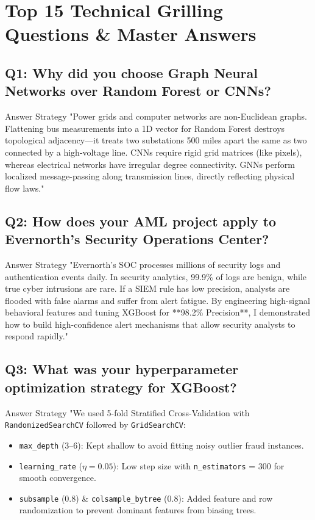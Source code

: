 \documentclass[11pt,a4paper]{article}
\begin{document}
\section{Top 15 Technical Grilling Questions \& Master Answers}

\subsection*{Q1: Why did you choose Graph Neural Networks over Random Forest or CNNs?}
\begin{ansbox}{Answer Strategy}
"Power grids and computer networks are non-Euclidean graphs. Flattening bus measurements into a 1D vector for Random Forest destroys topological adjacency—it treats two substations 500 miles apart the same as two connected by a high-voltage line. CNNs require rigid grid matrices (like pixels), whereas electrical networks have irregular degree connectivity. GNNs perform localized message-passing along transmission lines, directly reflecting physical flow laws."
\end{ansbox}

\subsection*{Q2: How does your AML project apply to Evernorth's Security Operations Center?}
\begin{ansbox}{Answer Strategy}
"Evernorth's SOC processes millions of security logs and authentication events daily. In security analytics, 99.9\% of logs are benign, while true cyber intrusions are rare. If a SIEM rule has low precision, analysts are flooded with false alarms and suffer from alert fatigue. By engineering high-signal behavioral features and tuning XGBoost for **98.2\% Precision**, I demonstrated how to build high-confidence alert mechanisms that allow security analysts to respond rapidly."
\end{ansbox}

\subsection*{Q3: What was your hyperparameter optimization strategy for XGBoost?}
\begin{ansbox}{Answer Strategy}
"We used 5-fold Stratified Cross-Validation with \texttt{RandomizedSearchCV} followed by \texttt{GridSearchCV}:
\begin{itemize}
    \item \texttt{max\_depth} (3--6): Kept shallow to avoid fitting noisy outlier fraud instances.
    \item \texttt{learning\_rate} ($\eta = 0.05$): Low step size with \texttt{n\_estimators} = 300 for smooth convergence.
    \item \texttt{subsample} (0.8) \& \texttt{colsample\_bytree} (0.8): Added feature and row randomization to prevent dominant features from biasing trees.
\end{itemize}
\end{ansbox}
\end{document}
